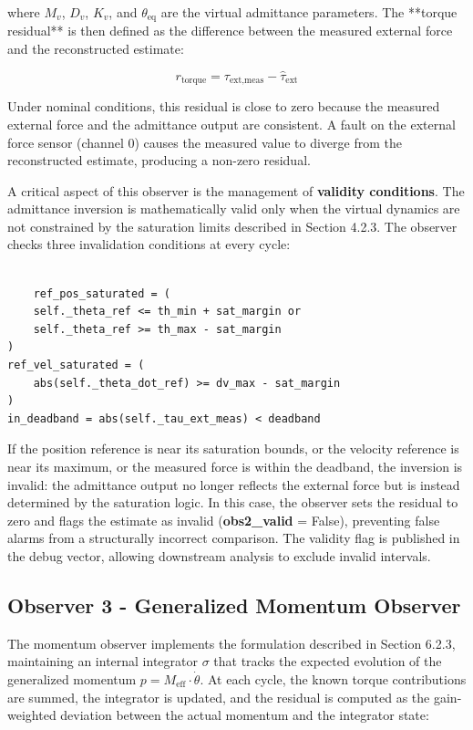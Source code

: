 where $M_v$, $D_v$, $K_v$, and $\theta_{\text{eq}}$ are the virtual admittance parameters. The **torque residual** is then defined as the difference between the measured external force and the reconstructed estimate:

\begin{equation}
    r_{\text{torque}} = \tau_{\text{ext,meas}} - \hat{\tau}_{\text{ext}}
\end{equation}

Under nominal conditions, this residual is close to zero because the measured external force and the admittance output are consistent. A fault on the external force sensor (channel 0) causes the measured value to diverge from the reconstructed estimate, producing a non-zero residual.
 
A critical aspect of this observer is the management of \textbf{validity conditions}. The admittance inversion is mathematically valid only when the virtual dynamics are not constrained by the saturation limits described in Section 4.2.3. The observer checks three invalidation conditions at every cycle:

\begin{verbatim}

    ref_pos_saturated = (
    self._theta_ref <= th_min + sat_margin or
    self._theta_ref >= th_max - sat_margin
)
ref_vel_saturated = (
    abs(self._theta_dot_ref) >= dv_max - sat_margin
)
in_deadband = abs(self._tau_ext_meas) < deadband

\end{verbatim}

If the position reference is near its saturation bounds, or the velocity reference is near its maximum, or the measured force is within the deadband, the inversion is invalid: the admittance output no longer reflects the external force but is instead determined by the saturation logic. In this case, the observer sets the residual to zero and flags the estimate as invalid (\textbf{obs2\_valid} = False), preventing false alarms from a structurally incorrect comparison. The validity flag is published in the debug vector, allowing downstream analysis to exclude invalid intervals.

\subsection{Observer 3 - Generalized Momentum Observer}
The momentum observer implements the formulation described in Section 6.2.3, maintaining an internal integrator $\sigma$ that tracks the expected evolution of the generalized momentum $p = M_{\text{eff}} \cdot \dot{\theta}$. At each cycle, the known torque contributions are summed, the integrator is updated, and the residual is computed as the gain-weighted deviation between the actual momentum and the integrator state:


